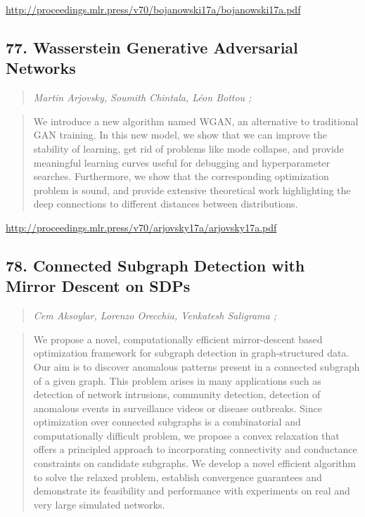 \documentclass{article}
\begin{document}
\href{http://proceedings.mlr.press/v70/bojanowski17a/bojanowski17a.pdf}{http://proceedings.mlr.press/v70/bojanowski17a/bojanowski17a.pdf}

\subsection{77. Wasserstein Generative Adversarial Networks}

\begin{quote}
\footnotesize{\textit{Martin Arjovsky, Soumith Chintala, Léon Bottou ;}}
\end{quote}

\begin{quote}
    We introduce a new algorithm named WGAN, an alternative to traditional GAN training. In this new model, we show that we can improve the stability of learning, get rid of problems like mode collapse, and provide meaningful learning curves useful for debugging and hyperparameter searches. Furthermore, we show that the corresponding optimization problem is sound, and provide extensive theoretical work highlighting the deep connections to different distances between distributions.  \end{quote}

\href{http://proceedings.mlr.press/v70/arjovsky17a/arjovsky17a.pdf}{http://proceedings.mlr.press/v70/arjovsky17a/arjovsky17a.pdf}

\subsection{78. Connected Subgraph Detection with Mirror Descent on SDPs}

\begin{quote}
\footnotesize{\textit{Cem Aksoylar, Lorenzo Orecchia, Venkatesh Saligrama ;}}
\end{quote}

\begin{quote}
    We propose a novel, computationally efficient mirror-descent based optimization framework for subgraph detection in graph-structured data. Our aim is to discover anomalous patterns present in a connected subgraph of a given graph. This problem arises in many applications such as detection of network intrusions, community detection, detection of anomalous events in surveillance videos or disease outbreaks. Since optimization over connected subgraphs is a combinatorial and computationally difficult problem, we propose a convex relaxation that offers a principled approach to incorporating connectivity and conductance constraints on candidate subgraphs. We develop a novel efficient algorithm to solve the relaxed problem, establish convergence guarantees and demonstrate its feasibility and performance with experiments on real and very large simulated networks.  \end{quote}
\end{document}
